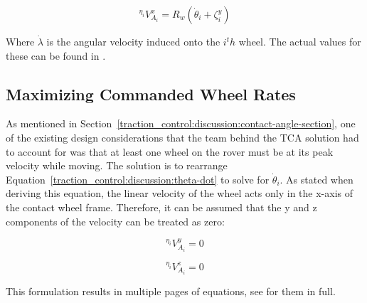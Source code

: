 \begin{equation}\label{traction_control:discussion:theta-dot}
	{}^{\eta_{i}}V^{x}_{A_{i}} = R_{w}\left(\dot{\theta}_{i} + \zeta^{y}_{i}\right)
\end{equation}

Where $\dot{\lambda}$ is the angular velocity induced onto the $i^th$ wheel. The actual values for these can be found in \cite{tractl}.

\subsection{Maximizing Commanded Wheel Rates}
As mentioned in Section~\ref{traction_control:discussion:contact-angle-section}, one of the existing design considerations that the team behind the \ac{TCA} solution had to account for was that at least one wheel on the rover must be at its peak velocity while moving. The solution is to rearrange Equation~\ref{traction_control:discussion:theta-dot} to solve for $\dot{\theta}_{i}$. As stated when deriving this equation, the linear velocity of the wheel acts only in the x-axis of the contact wheel frame. Therefore, it can be assumed that the y and z components of the velocity can be treated as zero:

\begin{equation}\label{traction_control:discussion:lin_vel_y}
	{}^{\eta_{i}}V^{y}_{A_{i}} = 0
\end{equation}

\begin{equation}\label{traction_control:discussion:lin_vel_z}
	{}^{\eta_{i}}V^{z}_{A_{i}} = 0
\end{equation}

This formulation results in multiple pages of equations, see \cite{tractl} for them in full.
